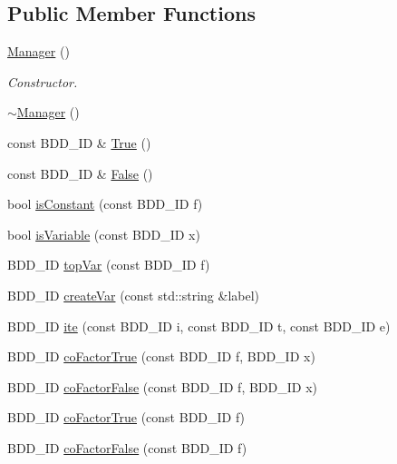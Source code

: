 \subsection*{Public Member Functions}
\begin{DoxyCompactItemize}
\item 
\hyperlink{classManager_a1658ff9f18e38ccd9cb8b0b371b9c20b}{Manager} ()
\begin{DoxyCompactList}\small\item\em Constructor. \end{DoxyCompactList}\item 
\hyperlink{classManager_a322cad25d7007438b3a043ad02253d29}{$\sim$\+Manager} ()
\item 
const B\+D\+D\+\_\+\+ID \& \hyperlink{classManager_a0c15aff167a7019502b66100c4ec0a33}{True} ()
\item 
const B\+D\+D\+\_\+\+ID \& \hyperlink{classManager_ae9bae01509e6063313024cd85a8eb569}{False} ()
\item 
bool \hyperlink{classManager_a98fe06b67d8114f1404a7b19dddc935b}{is\+Constant} (const B\+D\+D\+\_\+\+ID f)
\item 
bool \hyperlink{classManager_af026f76f68823bb9083f161b5db9e58b}{is\+Variable} (const B\+D\+D\+\_\+\+ID x)
\item 
B\+D\+D\+\_\+\+ID \hyperlink{classManager_a8ddf48759e4e3a5c9e92b07470372b7e}{top\+Var} (const B\+D\+D\+\_\+\+ID f)
\item 
B\+D\+D\+\_\+\+ID \hyperlink{classManager_a9fb480d8af44c75ee2b35b85f7038e68}{create\+Var} (const std\+::string \&label)
\item 
B\+D\+D\+\_\+\+ID \hyperlink{classManager_ab6b8135aadc0a5b91b5c651c4046da05}{ite} (const B\+D\+D\+\_\+\+ID i, const B\+D\+D\+\_\+\+ID t, const B\+D\+D\+\_\+\+ID e)
\item 
B\+D\+D\+\_\+\+ID \hyperlink{classManager_aa2bfdbb0fae8e09b2b766336cdf7ce94}{co\+Factor\+True} (const B\+D\+D\+\_\+\+ID f, B\+D\+D\+\_\+\+ID x)
\item 
B\+D\+D\+\_\+\+ID \hyperlink{classManager_aea635ff0e0ec0cc8b43799f2d18de598}{co\+Factor\+False} (const B\+D\+D\+\_\+\+ID f, B\+D\+D\+\_\+\+ID x)
\item 
B\+D\+D\+\_\+\+ID \hyperlink{classManager_ab2b73e9169e978c45a4ebf9aa3bddef8}{co\+Factor\+True} (const B\+D\+D\+\_\+\+ID f)
\item 
B\+D\+D\+\_\+\+ID \hyperlink{classManager_a3e3d13bac159441b8682338fe6a8bcb2}{co\+Factor\+False} (const B\+D\+D\+\_\+\+ID f)
\item 

\end{DoxyCompactItemize}
